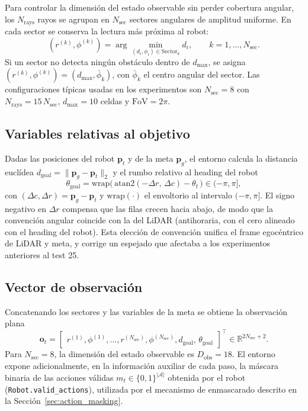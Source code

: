 Para controlar la dimensión del estado observable sin perder cobertura
angular, los $N_{\text{rays}}$ rayos se agrupan en $N_{\text{sec}}$
sectores angulares de amplitud uniforme. En cada sector se conserva la
lectura más próxima al robot:
\begin{equation}\label{eq:r_lidar_section}
    (r^{(k)}, \phi^{(k)}) =
    \arg\min_{(d_i, \phi_i)\in\text{Sector}_k} d_i,
    \qquad k = 1, \dots, N_{\text{sec}}.
\end{equation}
Si un sector no detecta ningún obstáculo dentro de $d_{\max}$, se asigna
$(r^{(k)}, \phi^{(k)}) = (d_{\max}, \bar{\phi}_k)$, con $\bar{\phi}_k$ el
centro angular del sector. Las configuraciones típicas usadas en los
experimentos son $N_{\text{sec}} = 8$ con $N_{\text{rays}} = 15\,N_{\text{sec}}$,
$d_{\max} = 10$ celdas y $\text{FoV} = 2\pi$.

\subsection{Variables relativas al objetivo}
Dadas las posiciones del robot $\mathbf{p}_t$ y de la meta
$\mathbf{p}_g$, el entorno calcula la distancia euclídea
$d_{\text{goal}} = \lVert \mathbf{p}_g - \mathbf{p}_t \rVert_2$ y el
rumbo relativo al heading del robot
\begin{equation}
    \theta_{\text{goal}} = \mathrm{wrap}\Big(\,\mathrm{atan2}(-\Delta r,\, \Delta c)
    - \theta_t\,\Big) \in (-\pi, \pi],
\end{equation}
con $(\Delta c, \Delta r) = \mathbf{p}_g - \mathbf{p}_t$ y
$\mathrm{wrap}(\cdot)$ el envoltorio al intervalo $(-\pi, \pi]$. El signo
negativo en $\Delta r$ compensa que las filas crecen hacia abajo, de modo
que la convención angular coincide con la del LiDAR (antihoraria, con el
cero alineado con el heading del robot). Esta elección de convención
unifica el frame egocéntrico de LiDAR y meta, y corrige un espejado que
afectaba a los experimentos anteriores al test 25.

\subsection{Vector de observación}
Concatenando los sectores y las variables de la meta se obtiene la
observación plana
\begin{equation}\label{eq:obs}
    \mathbf{o}_t = \begin{bmatrix}
        r^{(1)}, \phi^{(1)}, \dots, r^{(N_{\text{sec}})}, \phi^{(N_{\text{sec}})},
        d_{\text{goal}},\, \theta_{\text{goal}}
    \end{bmatrix}^\top \in \mathbb{R}^{2 N_{\text{sec}} + 2}.
\end{equation}
Para $N_{\text{sec}} = 8$, la dimensión del estado observable es
$D_{\text{obs}} = 18$. El entorno expone adicionalmente, en la información
auxiliar de cada paso, la máscara binaria de las acciones válidas
$m_t\in\{0,1\}^{|\mathcal{A}|}$ obtenida por el robot
(\texttt{Robot.valid\_actions}), utilizada por el mecanismo de
enmascarado descrito en la Sección~\ref{sec:action_masking}.

